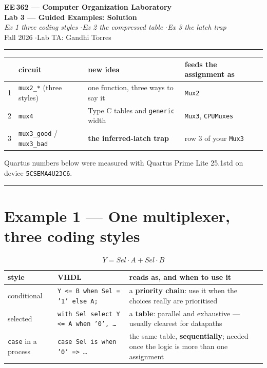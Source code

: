 \documentclass[11pt]{article}
\newcommand{\code}[1]{\texttt{#1}}
\newcommand{\hr}{\vspace{2pt}\hrule\vspace{6pt}}
\begin{document}
\begin{center}
{\Large\bfseries EE\,362 --- Computer Organization Laboratory}\\[2pt]
{\large\bfseries Lab 3 --- Guided Examples: Solution}\\[2pt]
{\itshape Ex 1 three coding styles \quad$\cdot$\quad Ex 2 the compressed table \quad$\cdot$\quad Ex 3 the latch trap}\\[4pt]
Fall 2026 \quad$\cdot$\quad Lab TA: Gandhi Torres
\end{center}
\hr

\begin{center}
\begin{tabular}{clll}
\toprule
& circuit & new idea & feeds the assignment as \\
\midrule
1 & \code{mux2\_*} (three styles) & one function, three ways to say it & \code{Mux2} \\
2 & \code{mux4} & Type C tables and \code{generic} width & \code{Mux3}, \code{CPUMuxes} \\
3 & \code{mux3\_good} / \code{mux3\_bad} & \textbf{the inferred-latch trap} & row 3 of your \code{Mux3} \\
\bottomrule
\end{tabular}
\end{center}

Quartus numbers below were measured with Quartus Prime Lite 25.1std on device
\code{5CSEMA4U23C6}.

\vspace{4pt}\hr

\section*{Example 1 --- One multiplexer, three coding styles}

\[
Y = \overline{Sel}\cdot A + Sel\cdot B
\]

\begin{center}
\small
\begin{tabular}{l>{\raggedright\arraybackslash}p{5.4cm}>{\raggedright\arraybackslash}p{6.2cm}}
\toprule
style & VHDL & reads as, and when to use it \\
\midrule
conditional & \code{Y <= B when Sel = '1' else A;}
  & a \textbf{priority chain}: use it when the choices really are prioritised \\
selected & \code{with Sel select Y <= A when '0', \dots}
  & a \textbf{table}: parallel and exhaustive --- usually clearest for datapaths \\
\code{case} in a process & \code{case Sel is when '0' => \dots}
  & the same table, \textbf{sequentially}; needed once the logic is more than one assignment \\
\bottomrule
\end{tabular}
\end{center}
\end{document}
